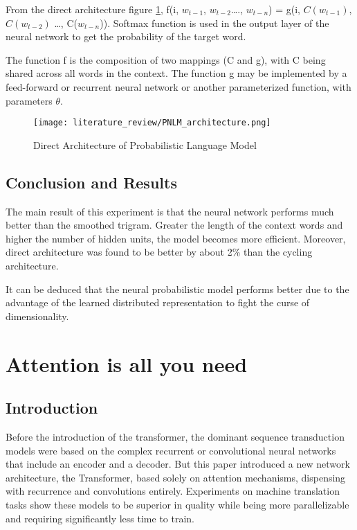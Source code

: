From the direct architecture figure \ref{fig:Probabilistic Language Model Architecture}, 
f(i, $w_{t - 1}$, $w_{t - 2}$…., $w_{t - n}$) = g(i, $C(w_{t - 1})$, $C(w_{t - 2})$ …, C($w_{t - n}$)). Softmax function is used in the output layer of the neural network to get the probability of the target word.

The function f is the composition of two mappings (C and g), with C being shared across all words in the context. The function g may be implemented by a feed-forward or recurrent neural network or another parameterized function, with parameters $\theta$.

\begin{figure}[H]
    \centering
    \texttt{[image: literature\_review/PNLM\_architecture.png]}
    \caption{Direct Architecture of Probabilistic Language Model}
    \label{fig:Probabilistic Language Model Architecture}
\end{figure}

\subsection{Conclusion and Results}
The main result of this experiment is that the neural network performs much better than the smoothed trigram. Greater the length of the context words and higher the number of hidden units, the model becomes more efficient. Moreover, direct architecture was found to be better by about 2\% than the cycling architecture.

It can be deduced that the neural probabilistic model performs better due to the advantage of the learned distributed representation to fight the curse of dimensionality.

\section{Attention is all you need}
\subsection{Introduction}
Before the introduction of the transformer, the dominant sequence transduction models were based on the complex recurrent or convolutional neural networks that include an encoder and a decoder. But this paper introduced a new network architecture, the Transformer, based solely on attention mechanisms, dispensing with recurrence and convolutions entirely. Experiments on machine translation tasks show these models to be superior in quality while being more parallelizable and requiring significantly less time to train.

